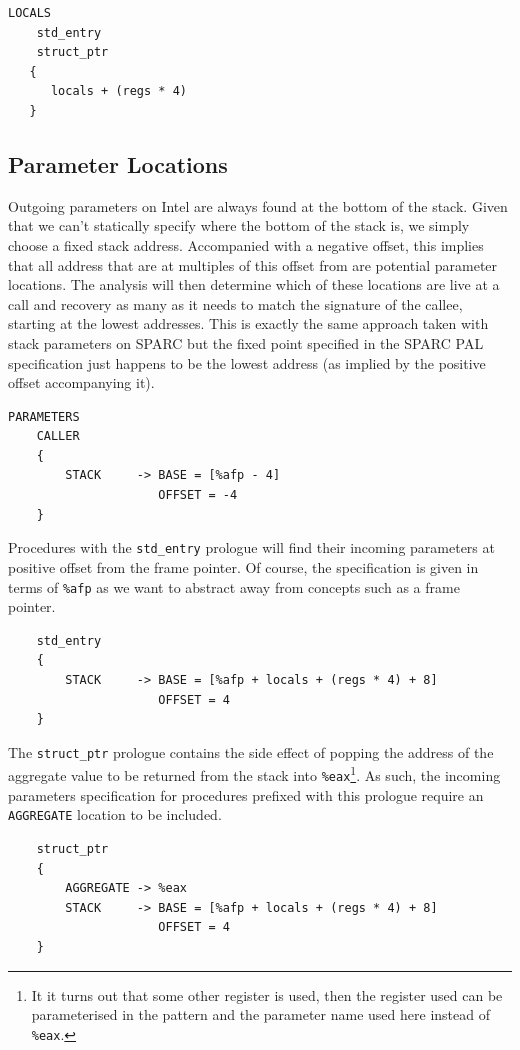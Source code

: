 \begin{verbatim}
LOCALS
    std_entry
    struct_ptr
   {
      locals + (regs * 4)
   }
\end{verbatim}

\subsection{Parameter Locations}

Outgoing parameters on Intel are always found at the bottom of the
stack. Given that we can't statically specify where the bottom of
the stack is, we simply choose a fixed stack address. Accompanied
with a negative offset, this implies that all address that are at
multiples of this offset from are potential parameter locations. The
analysis will then determine which of these locations are live at a
call and recovery as many as it needs to match the signature of the
callee, starting at the lowest addresses. This is exactly the same
approach taken with stack parameters on SPARC but the fixed point
specified in the SPARC PAL specification just happens to be the lowest
address (as implied by the positive offset accompanying it).

\begin{verbatim}
PARAMETERS
    CALLER
    {
        STACK     -> BASE = [%afp - 4]
                     OFFSET = -4
    }
\end{verbatim}

Procedures with the {\tt std\_entry} prologue will find their incoming
parameters at positive offset from the frame pointer. Of course, the
specification is given in terms of {\tt \%afp} as we want to abstract
away from concepts such as a frame pointer.

\begin{verbatim}
    std_entry
    {
        STACK     -> BASE = [%afp + locals + (regs * 4) + 8]
                     OFFSET = 4
    }
\end{verbatim}

The {\tt struct\_ptr} prologue contains the side effect of popping
the address of the aggregate value to be returned from the stack into
{\tt \%eax}\footnote{It it turns out that some other register is used,
then the register used can be parameterised in the pattern and the
parameter name used here instead of {\tt \%eax}.}. As such, the
incoming parameters specification for procedures prefixed with this
prologue require an {\tt AGGREGATE} location to be included.

\begin{verbatim}
    struct_ptr
    {
        AGGREGATE -> %eax
        STACK     -> BASE = [%afp + locals + (regs * 4) + 8]
                     OFFSET = 4
    }
\end{verbatim}

